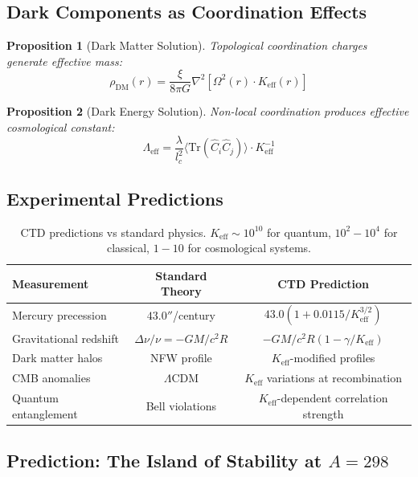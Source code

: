 \documentclass[11pt,a4paper]{article}
\newtheorem{proposition}{Proposition}
\begin{document}
\subsection{Dark Components as Coordination Effects}

\begin{proposition}[Dark Matter Solution]
	Topological coordination charges generate effective mass:
	\[
	\rho_{\mathrm{DM}}(r) = \frac{\xi}{8\pi G} \nabla^2 \left[ \Omega^2(r) \cdot K_{\mathrm{eff}}(r) \right]
	\]
\end{proposition}

\begin{proposition}[Dark Energy Solution]
	Non-local coordination produces effective cosmological constant:
	\[
	\Lambda_{\mathrm{eff}} = \frac{\lambda}{l_c^2} \langle \mathrm{Tr}(\hat{C}_i\hat{C}_j) \rangle \cdot K_{\mathrm{eff}}^{-1}
	\]
\end{proposition}

\subsection{Experimental Predictions}

\begin{table}[htbp]
	\centering
	\begin{tabular}{lcc}
		\toprule
		\textbf{Measurement} & \textbf{Standard Theory} & \textbf{CTD Prediction} \\
		\midrule
		Mercury precession & $43.0''$/century & $43.0(1 + 0.0115/K_{\mathrm{eff}}^{3/2})$ \\
		Gravitational redshift & $\Delta\nu/\nu = -GM/c^2R$ & $-GM/c^2R(1 - \gamma/K_{\mathrm{eff}})$ \\
		Dark matter halos & NFW profile & $K_{\mathrm{eff}}$-modified profiles \\
		CMB anomalies & $\Lambda$CDM & $K_{\mathrm{eff}}$ variations at recombination \\
		Quantum entanglement & Bell violations & $K_{\mathrm{eff}}$-dependent correlation strength \\
		\bottomrule
	\end{tabular}
	\caption{CTD predictions vs standard physics. $K_{\mathrm{eff}} \sim 10^{10}$ for quantum, $10^2-10^4$ for classical, $1-10$ for cosmological systems.}
\end{table}

\subsection{Prediction: The Island of Stability at $A=298$}
\end{document}
